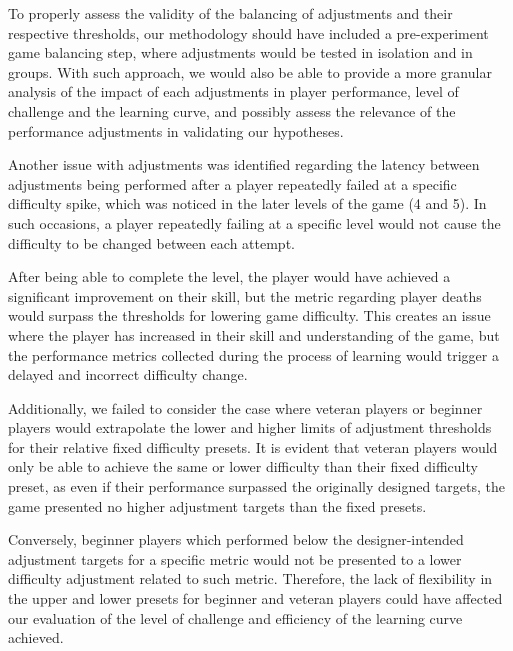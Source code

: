 To properly assess the validity of the balancing of adjustments and their respective thresholds, our methodology should have included a pre-experiment game balancing step, where adjustments would be tested in isolation and in groups. With such approach, we would also be able to provide a more granular analysis of the impact of each adjustments in player performance, level of challenge and the learning curve, and possibly assess the relevance of the performance adjustments in validating our hypotheses.

Another issue with adjustments was identified regarding the latency between adjustments being performed after a player repeatedly failed at a specific difficulty spike, which was noticed in the later levels of the game (4 and 5). In such occasions, a player repeatedly failing at a specific level would not cause the difficulty to be changed between each attempt.

After being able to complete the level, the player would have achieved a significant improvement on their skill, but the metric regarding player deaths would surpass the thresholds for lowering game difficulty. This creates an issue where the player has increased in their skill and understanding of the game, but the performance metrics collected during the process of learning would trigger a delayed and incorrect difficulty change.

Additionally, we failed to consider the case where veteran players or beginner players would extrapolate the lower and higher limits of adjustment thresholds for their relative fixed difficulty presets. It is evident that veteran players would only be able to achieve the same or lower difficulty than their fixed difficulty preset, as even if their performance surpassed the originally designed targets, the game presented no higher adjustment targets than the fixed presets.

Conversely, beginner players which performed below the designer-intended adjustment targets for a specific metric would not be presented to a lower difficulty adjustment related to such metric. Therefore, the lack of flexibility in the upper and lower presets for beginner and veteran players could have affected our evaluation of the level of challenge and efficiency of the learning curve achieved.

